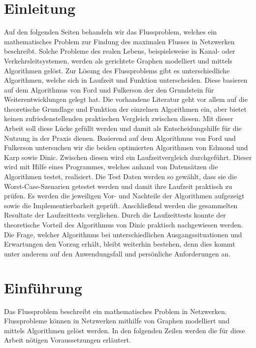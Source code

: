 \documentclass[a4paper]{llncs}
\begin{document}
\section{Einleitung}
\label{Einleitung}

Auf den folgenden Seiten behandeln wir das Flussproblem, welches ein mathematisches Problem zur Findung des maximalen Flusses in Netzwerken beschreibt.
 Solche Probleme des realen Lebens, beispielsweise in Kanal- oder Verkehrsleitsystemen, werden als gerichtete Graphen modelliert und mittels Algorithmen gelöst.
 Zur Lösung des Flussproblems gibt es unterschiedliche Algorithmen, welche sich in Laufzeit und Funktion unterscheiden. Diese basieren auf dem Algorithmus von Ford und Fulkerson der den Grundstein für Weiterentwicklungen gelegt hat.
 Die vorhandene Literatur geht vor allem auf die theoretische Grundlage und Funktion der einzelnen Algorithmen ein,  aber bietet keinen zufriedenstellenden praktischen Vergleich zwischen diesen.
 Mit dieser Arbeit soll diese Lücke gefüllt werden und damit als Entscheidungshilfe für die Nutzung in der Praxis dienen.
Basierend auf dem Algorithmus von Ford und Fulkerson untersuchen wir die beiden optimierten Algorithmen von Edmond und Karp sowie Dinic.
Zwischen diesen wird ein Laufzeitvergleich durchgeführt.
Dieser wird mit Hilfe eines Programmes, welches anhand von Datensätzen die Algorithmen testet, realisiert.
Die Test Daten werden so gewählt, dass sie die Worst-Case-Szenarien getestet werden und damit ihre Laufzeit praktisch zu prüfen.
Es werden die jeweiligen Vor- und Nachteile der Algorithmen aufgezeigt sowie die Implementierbarkeit geprüft. Anschließend werden die gesammelten Resultate der Laufzeittests verglichen.
Durch die Laufzeittests konnte der theoretische Vorteil des Algorithmus von Dinic praktisch nachgewiesen werden.
 Die Frage, welcher Algorithmus bei unterschiedlichen Ausgangssituationen und Erwartungen den Vorzug erhält, bleibt weiterhin bestehen, denn dies kommt unter anderem auf den Anwendungsfall und persönliche Anforderungen an.

\section{Einführung}
\label{Einfuehrung}

Das Flussproblem beschreibt ein mathematisches Problem in Netzwerken.\\
Flussprobleme können in Netzwerken mithilfe von Graphen modelliert und mittels Algorithmen gelöst werden. In den folgenden Zeilen werden die für diese Arbeit nötigen Voraussetzungen erläutert.
\end{document}
